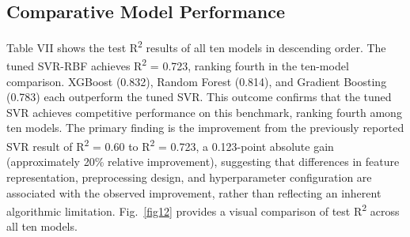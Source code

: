 \documentclass[pdflatex,sn-mathphys-num]{sn-jnl}
\begin{document}
\subsection{Comparative Model Performance}
Table VII shows the test R\textsuperscript{2} results of all ten models in descending order. The tuned SVR-RBF achieves R\textsuperscript{2} = 0.723, ranking fourth in the ten-model comparison. XGBoost (0.832), Random Forest (0.814), and Gradient Boosting (0.783) each outperform the tuned SVR. This outcome confirms that the tuned SVR achieves competitive performance on this benchmark, ranking fourth among ten models. The primary finding is the improvement from the previously reported SVR result of R\textsuperscript{2} = 0.60 to R\textsuperscript{2} = 0.723, a 0.123-point absolute gain (approximately 20\% relative improvement), suggesting that differences in feature representation, preprocessing design, and hyperparameter configuration are associated with the observed improvement, rather than reflecting an inherent algorithmic limitation. Fig.~\ref{fig12} provides a visual comparison of test R\textsuperscript{2} across all ten models.
\end{document}
